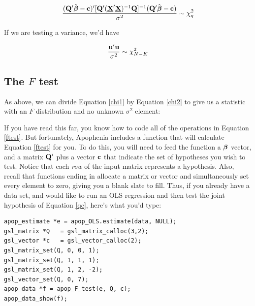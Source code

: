 \begin{equation}		\label{chi1}
{({\bf Q}'\hat{{\mbox{\boldmath$\beta$}}}- {\bf c})' [{\bf Q}' (\underbar{\bf X}'\underbar{\bf X})^{-1} {\bf Q}]^{-1} ({\bf Q}' \hat{{\mbox{\boldmath$\beta$}}}- {\bf c})
\over \sigma^2} \sim \chi^2_q
\end{equation}

If we are testing a variance, we'd have 

\begin{equation}		\label{chi2}
{{\bf u}' {\bf u} \over \sigma^2} \sim \chi^2_{N-K}
\end{equation}


\subsection{The $F$ test}\label{ftestsec}

As above, we can divide Equation \ref{chi1} by Equation \ref{chi2}
to give us a statistic with an $F$ distribution and no unknown
$\sigma^2$ element:



If you have read this far, you know how to code all of the operations
in Equation \ref{ftest}.  But fortunately, 
Apophenia includes a function that will calculate Equation \ref{ftest}
for you.
To do this, you will need to feed the function a ${\mbox{\boldmath$\beta$}}$ vector, and a
matrix ${\bf Q}'$ plus a vector ${\bf c}$ that indicate the set of hypotheses
you wish to test. Notice that each {\em row} of the input matrix represents a
hypothesis. Also, recall that functions ending in  allocate
a matrix or vector and simultaneously set every element to zero, giving
you a blank slate to fill. Thus, if you already have a data set, and
would like to run an OLS regression and then test the joint hypothesis
of Equation \ref{qc}, here's what you'd type:
\begin{lstlisting}
apop_estimate *e = apop_OLS.estimate(data, NULL);
gsl_matrix *Q   = gsl_matrix_calloc(3,2);
gsl_vector *c   = gsl_vector_calloc(2);
gsl_matrix_set(Q, 0, 0, 1);
gsl_matrix_set(Q, 1, 1, 1);
gsl_matrix_set(Q, 1, 2, -2);
gsl_vector_set(Q, 0, 7);
apop_data *f = apop_F_test(e, Q, c);
apop_data_show(f);
\end{lstlisting}

